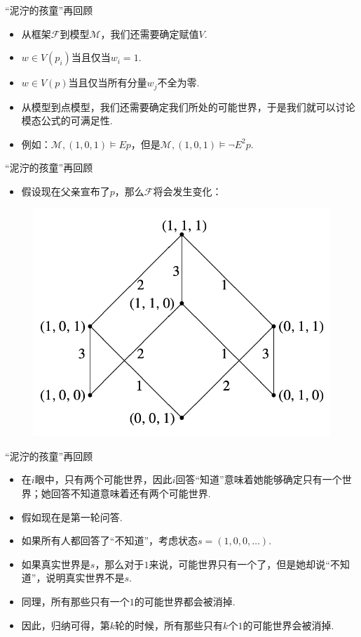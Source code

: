 \begin{frame}{“泥泞的孩童”再回顾}
\begin{itemize}
    \item 从框架$\mathcal F$到模型$\mathcal M$，我们还需要确定赋值$V$.
    \item $w\in V(p_i)$当且仅当$w_i=1$.
    \item $w\in V(p)$当且仅当所有分量$w_j$不全为零.
    \item 从模型到点模型，我们还需要确定我们所处的可能世界，于是我们就可以讨论模态公式的可满足性.
    \item 例如：$\mathcal M,(1,0,1)\vDash Ep$，但是$\mathcal M,(1,0,1)\vDash \neg E^2p$.
\end{itemize}
\end{frame}

\begin{frame}{“泥泞的孩童”再回顾}
\begin{itemize}
    \item 假设现在父亲宣布了$p$，那么$\mathcal F$将会发生变化：
\end{itemize}
\begin{figure}[ht]
    \centering
    \includegraphics[scale=0.5]{Figures/modal-logic/cubic-example-after-father.png}
\end{figure}
\end{frame}

\begin{frame}{“泥泞的孩童”再回顾}
\begin{itemize}
    \item 在$i$眼中，只有两个可能世界，因此$i$回答“知道”意味着她能够确定只有一个世界；她回答不知道意味着还有两个可能世界.
    \item 假如现在是第一轮问答.
    \item 如果所有人都回答了“不知道”，考虑状态$s=(1,0,0,\dots)$.
    \item 如果真实世界是$s$，那么对于$1$来说，可能世界只有一个了，但是她却说“不知道”，说明真实世界不是$s$.
    \item 同理，所有那些只有一个$1$的可能世界都会被消掉.
    \item 因此，归纳可得，第$k$轮的时候，所有那些只有$k$个$1$的可能世界会被消掉. %
\end{itemize}
\end{frame}

